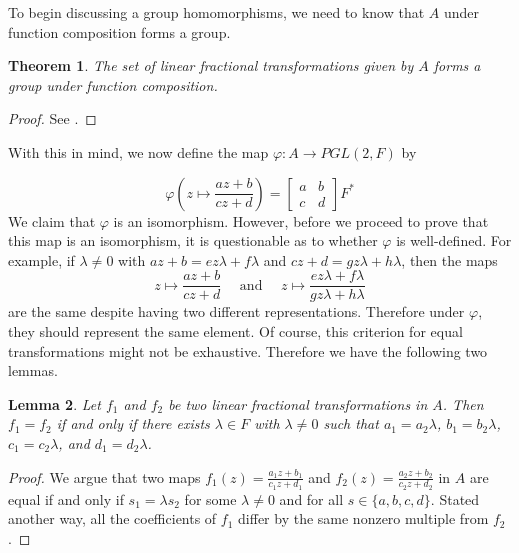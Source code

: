 \documentclass[12pt]{article}
\newcommand{\lftmat}[4]{\begin{bmatrix} {#1} & {#2} \\ {#3} & {#4} \end{bmatrix}}
\newcommand{\stanlftmat}{\lftmat{a}{b}{c}{d}}
\theoremstyle{plain}
\newtheorem{theorem}{Theorem}[section]
\newtheorem{lemma}[theorem]{Lemma}
\theoremstyle{definition}
\begin{document}
\begin{appendices}
	To begin discussing a group homomorphisms, we need to know that $A$ under function composition forms a group. 
	
\begin{theorem}
	The set of linear fractional transformations given by $A$ forms a group under function composition.
\end{theorem}

\begin{proof}
	See \cite{shuman_lfts}.
\end{proof}
	
With this in mind, we now define the map $\varphi\colon A\rightarrow PGL(2,F)$ by

	\[
		\varphi\left(z\mapsto \frac{az + b}{cz + d}\right) = \stanlftmat F^*
	\]
	We claim that $\varphi$ is an isomorphism. However, before we proceed to prove that this map is an isomorphism, it is questionable as to whether $\varphi$ is well-defined. For example, if $\lambda \neq 0$ with $az + b = ez\lambda + f\lambda$ and $cz + d = gz\lambda + h\lambda$, then the maps
\[
	z\mapsto\frac{az + b}{cz + d}\quad\text{ and }\quad z\mapsto\frac{ez\lambda + f\lambda}{gz\lambda + h\lambda}
\]  
are the same despite having two different representations. Therefore under $\varphi$, they should represent the same element. Of course, this criterion for equal transformations might not be exhaustive. Therefore we have the following two lemmas.

\begin{lemma}\label{thm:lft_equality}
	Let $f_1$ and $f_2$ be two linear fractional transformations in $A$. Then $f_1 = f_2$ if and only if there exists $\lambda\in F$ with $\lambda\neq 0$ such that $a_1 = a_2\lambda$, $b_1 = b_2\lambda$, $c_1 = c_2\lambda$, and $d_1 = d_2\lambda$.
\end{lemma}

\begin{proof}
	We argue that two maps $f_1(z) = \frac{a_1z + b_1}{c_1z + d_1}$ and $f_2(z) = \frac{a_2 z + b_2}{c_2 z + d_2}$ in $A$ are equal if and only if $s_1 = \lambda s_2$ for some $\lambda\neq 0$ and for all $s\in\{a,b,c,d\}$. Stated another way, all the coefficients of $f_1$ differ by the same nonzero multiple from $f_2$.
	

\end{proof}
\end{appendices}
\end{document}
